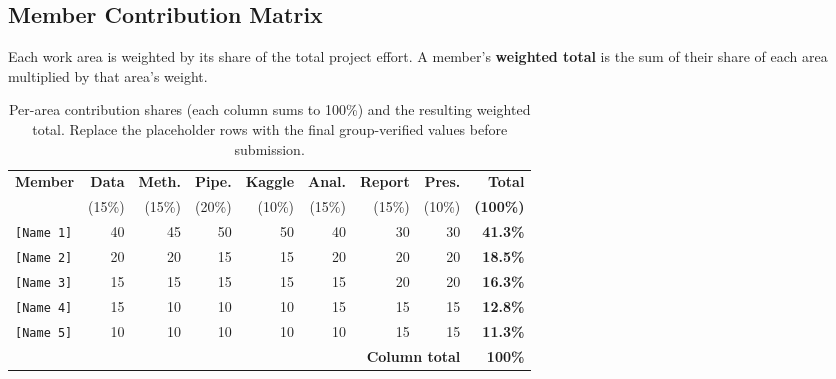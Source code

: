 \documentclass[11pt,a4paper]{article}
\begin{document}
\subsection*{Member Contribution Matrix}
Each work area is weighted by its share of the total project effort. A member's
\textbf{weighted total} is the sum of their share of each area multiplied by that
area's weight.

\vspace{4pt}
\begin{table}[h]
\centering
\small
\begin{tabular}{@{}p{2.6cm}rrrrrrrr@{}}
\toprule
\textbf{Member} & \textbf{Data} & \textbf{Meth.} & \textbf{Pipe.} & \textbf{Kaggle} &
\textbf{Anal.} & \textbf{Report} & \textbf{Pres.} & \textbf{Total} \\
 & (15\%) & (15\%) & (20\%) & (10\%) & (15\%) & (15\%) & (10\%) & \textbf{(100\%)} \\
\midrule
\texttt{[Name 1]} & 40 & 45 & 50 & 50 & 40 & 30 & 30 & \textbf{41.3\%} \\
\texttt{[Name 2]} & 20 & 20 & 15 & 15 & 20 & 20 & 20 & \textbf{18.5\%} \\
\texttt{[Name 3]} & 15 & 15 & 15 & 15 & 15 & 20 & 20 & \textbf{16.3\%} \\
\texttt{[Name 4]} & 15 & 10 & 10 & 10 & 15 & 15 & 15 & \textbf{12.8\%} \\
\texttt{[Name 5]} & 10 & 10 & 10 & 10 & 10 & 15 & 15 & \textbf{11.3\%} \\
\midrule
\multicolumn{8}{r}{\textbf{Column total}} & \textbf{100\%} \\
\bottomrule
\end{tabular}
\caption{Per-area contribution shares (each column sums to 100\%) and the resulting
weighted total. Replace the placeholder rows with the final group-verified values
before submission.}
\label{tab:contribution}
\end{table}
\end{document}
